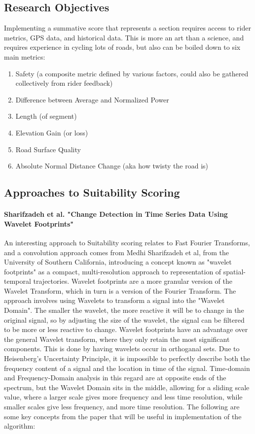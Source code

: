 \documentclass[12pt,a4paper]{report}
\begin{document}
\subsection{Research Objectives}
Implementing a summative score that represents a section requires access to rider metrics, GPS data, and historical data. This is more an art than a science, and requires
experience in cycling lots of roads, but also can be boiled down to six main metrics:
\begin{enumerate}
	\item Safety (a composite metric defined by various factors, could also be gathered collectively from rider feedback)
	\item Difference between Average and Normalized Power
	\item Length (of segment)
	\item Elevation Gain (or loss)
	\item Road Surface Quality
	\item Absolute Normal Distance Change (aka how twisty the road is)
\end{enumerate}


\subsection{Approaches to Suitability Scoring}

\paragraph{Sharifzadeh et al. "Change Detection in Time Series Data Using Wavelet Footprints"}
An interesting approach to Suitability scoring relates to Fast Fourier Transforms, and a convolution approach comes from Medhi Sharifzadeh et al, from the University of Southern California, introducing a concept known as
"wavelet footprints" as a compact, multi-resolution approach to representation of spatial-temporal trajectories. Wavelet footprints are a  more granular version of the Wavelet Transform, which in turn is a version of the Fourier Transform. The approach involves using Wavelets to transform a signal into the "Wavelet Domain".
The smaller the wavelet, the more reactive it will be to change in the original signal, so by adjusting the size of the wavelet, the signal can be filtered to be more or less reactive to change.
Wavelet footprints have an advantage over the general Wavelet transform, where they only retain the most significant components. This is done by having wavelets occur in orthoganal sets.
Due to Heisenberg's Uncertainty Principle, it is impossible to perfectly describe both the frequency content of a signal and the location in time of the signal. Time-domain and Frequency-Domain analysis in this regard are
at opposite ends of the spectrum, but the Wavelet Domain sits in the middle, allowing for a sliding scale value, where a larger scale gives more frequency and less time resolution, while smaller scales give less frequency, and more time resolution.
The following are some key concepts from the paper that will be useful in implementation of the algorithm:
\end{document}
